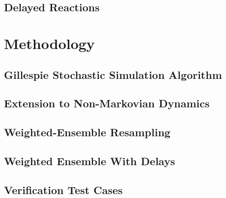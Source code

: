 \documentclass[english,letterpaper,12pt]{article}
\begin{document}
\begin{doublespacing}
\subsection{Delayed Reactions} %
\label{sub:delayed-reactions}





\section{Methodology} %
\label{sec:methodology}

\subsection{Gillespie Stochastic Simulation Algorithm} %
\label{sub:gillespie-ssa}


\subsection{Extension to Non-Markovian Dynamics} %
\label{sub:non-markovian}



\subsection{Weighted-Ensemble Resampling} %
\label{sub:we-resampling-intro}


\subsection{Weighted Ensemble With Delays} %
\label{sub:we-delays}


\subsection{Verification Test Cases} %
\label{sub:verification}


\end{doublespacing}
\end{document}
